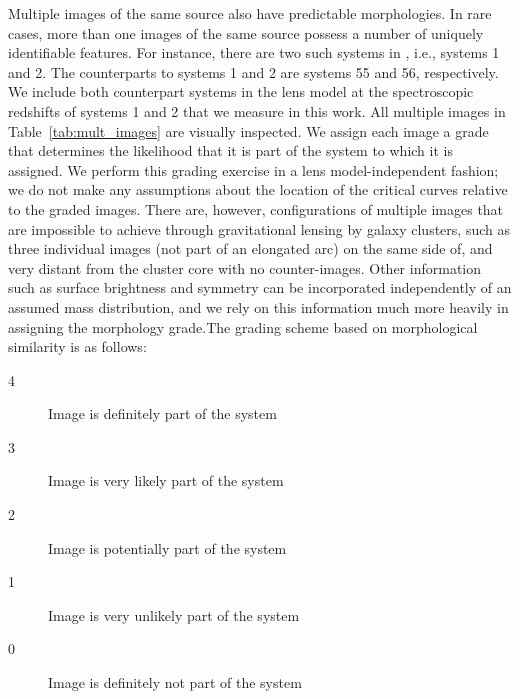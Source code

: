 Multiple images of the same source also have predictable morphologies. In rare cases, more than one images of the
same source possess a number of uniquely identifiable features. For instance, there are two such systems in
\cler, i.e., systems 1 and 2. The counterparts to systems 1 and 2 are systems 55 and 56, respectively. We include
both counterpart systems in the lens model at the spectroscopic redshifts of systems 1 and 2 that we measure in
this work. All multiple images in Table~\ref{tab:mult_images} are visually inspected. We assign each image a
grade that determines the likelihood that it is part of the system to which it is assigned.  We perform this
grading exercise in a lens model-independent fashion; we do not make any assumptions about the location of the
critical curves relative to the graded images. There are, however, configurations of multiple images that are
impossible to achieve through gravitational lensing by galaxy clusters, such as three individual images (not part
of an elongated arc) on the same side of, and very distant from the cluster core with no counter-images. Other
information such as surface brightness and symmetry can be incorporated independently of an assumed mass
distribution, and we rely on this information much more heavily in assigning the morphology grade.The grading
scheme based on morphological similarity is as follows:
\begin{description}
    \item[4] Image is definitely part of the system
	\item[3] Image is very likely part of the system
	\item[2] Image is potentially part of the system
	\item[1] Image is very unlikely part of the system
	\item[0] Image is definitely not part of the system
\end{description}


